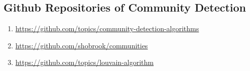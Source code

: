 \documentclass{article}
\begin{document}
\subsection{Github Repositories of Community Detection}
\begin{enumerate}
    \item \url{https://github.com/topics/community-detection-algorithms}
    \item \url{https://github.com/shobrook/communities}
    \item \url{https://github.com/topics/louvain-algorithm}
 \end{enumerate}  



% 


\end{document}
